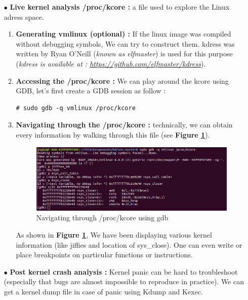 \begin{itemize}
	\item[$\bullet$] \textbf{Live kernel analysis /proc/kcore : } a file used to explore the Linux adress space.
		\begin{enumerate}
			\item \textbf{Generating vmlinux (optional) : } If the linux image was compiled without debugging symbols, We can try to construct them. \og kdress \fg was written by Ryan O'Neill (\textit{known as elfmaster}) is used for this purpose (\textit{kdress is available at : {\color{blue}\url{https://github.com/elfmaster/kdress}}}).
			
			
			\item \textbf{Accessing the /proc/kcore : }  We can play around the kcore using GDB, let's first create a GDB session as follow :
	\begin{lstlisting}[style=BashInputStyle]
# sudo gdb -q vmlinux /proc/kcore
	\end{lstlisting}			

			\item \textbf{Navigating through the /proc/kcore : } technically, we can obtain every information by walking through this file (see \textbf{Figure \ref{Navigating through /proc/kcore using gdb}}).
	
	\begin{figure}[H]
		\centering
        \includegraphics[scale=0.40]{img/solution/gdb-kcore-proc-navigation.png}
        \caption{Navigating through /proc/kcore using gdb}
        \label{Navigating through /proc/kcore using gdb}
    \end{figure}		
As shown in \textbf{Figure \ref{Navigating through /proc/kcore using gdb}}, We have been displaying various kernel information (like jiffies and location of sys\_close). One can even write or place breakpoints on particular functions or instructions. 			
		\end{enumerate}
	\item[$\bullet$] \textbf{Post kernel crash analysis : } Kernel panic can be hard to troubleshoot (especially that bugs are almost impossible to reproduce in practice). We can get a kernel dump file in case of panic using Kdump and Kexec.
	

\end{itemize}
